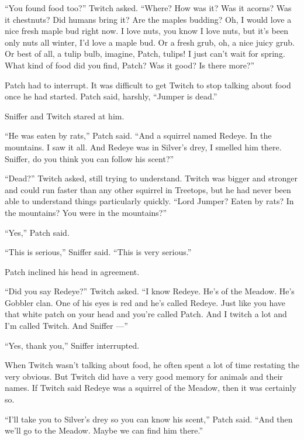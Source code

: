 \documentclass[ebook,oneside,openany,17pt]{memoir}
\newenvironment{tolerant}[1]{%
  \par\tolerance=#1\relax
}{%
  \par
}
\begin{document}
“You found food too?” Twitch asked. “Where? How was it? Was it acorns?
Was it chestnuts? Did humans bring it? Are the maples budding?  Oh, I
would love a nice fresh maple bud right now. I love nuts, you know I
love nuts, but it’s been only nuts all winter, I’d love a maple
bud. Or a fresh grub, oh, a nice juicy grub. Or best of all, a tulip
bulb, imagine, Patch, tulips! I just can’t wait for spring. What kind
of food did you find, Patch? Was it good? Is there more?”

\begin{tolerant}{2000}
Patch had to interrupt. It was difficult to get Twitch to stop talking
about food once he had started. Patch said, harshly, “Jumper is dead.”
\end{tolerant}

Sniffer and Twitch stared at him.

“He was eaten by rats,” Patch said. “And a squirrel named Redeye. In
the mountains. I saw it all. And Redeye was in Silver’s drey, I
smelled him there. Sniffer, do you think you can follow his scent?”

\begin{tolerant}{1000}
“Dead?” Twitch asked, still trying to understand. Twitch was bigger
and stronger and could run faster than any other squirrel in Treetops,
but he had never been able to understand things particularly
quickly. “Lord Jumper? Eaten by rats? In the mountains? You were in
the mountains?”
\end{tolerant}

“Yes,” Patch said.

“This is serious,” Sniffer said. “This is very serious.”

Patch inclined his head in agreement.

“Did you say Redeye?” Twitch asked. “I know Redeye. He’s of the
Meadow. He’s Gobbler clan. One of his eyes is red and he’s called
Redeye. Just like you have that white patch on your head and you’re
called Patch. And I twitch a lot and I’m called Twitch. And Sniffer —”

“Yes, thank you,” Sniffer interrupted.

When Twitch wasn’t talking about food, he often spent a lot of time
restating the very obvious. But Twitch did have a very good memory for
animals and their names. If Twitch said Redeye was a squirrel of the
Meadow, then it was certainly so.

“I’ll take you to Silver’s drey so you can know his scent,” Patch
said. “And then we’ll go to the Meadow. Maybe we can find him there.”
\end{document}
